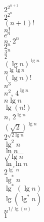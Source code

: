 
    \clearpage
    $2^{2^{n+1}}$\\
    $2^{2^n}$\\

    $(n+1)!$\\
    $n!$\\

    $e^n$\\
    $n \cdot 2^n$\\
    $2^n$\\
    $\frac{3}{2}^{n}$\\

    $(\lg n)^{\lg n}$ \\ %
    $n^{\lg\lg n}$\\ %

    $(\lg n)!$\\ %

    $n^3$\\
    $n^2$, $4^{\lg n}$\\ %
    $n\lg n$\\
    $\lg (n!)$\\ %
    $n$, $2^{\lg n}$\\ %
    $(\sqrt{2})^{\lg n}$\\ %

    $2^{\sqrt{2\lg n}}$\\

    $\lg^2 n$\\
    $\ln n$\\

    $\sqrt{\lg n}$\\ %
    $\ln\ln n$\\

    $2^{\lg^* n}$\\ %
    $\lg^* n$\\
    $\lg^*(\lg n)$\\ %

    $\lg(\lg^* n)$\\

    $n^{1/\lg(n)}$\\ %
    $1$\\
